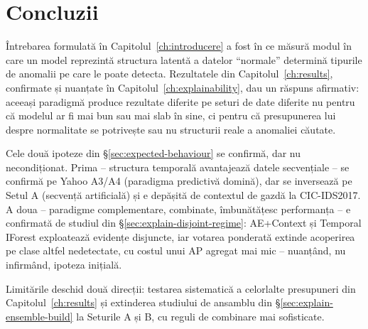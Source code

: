 \chapter{Concluzii}
\label{ch:concluzii}

Întrebarea formulată în Capitolul~\ref{ch:introducere} a fost în ce măsură modul în care un model reprezintă structura latentă a datelor \enquote{normale} determină tipurile de anomalii pe care le poate detecta. Rezultatele din Capitolul~\ref{ch:results}, confirmate și nuanțate în Capitolul~\ref{ch:explainability}, dau un răspuns afirmativ: aceeași paradigmă produce rezultate diferite pe seturi de date diferite nu pentru că modelul ar fi mai bun sau mai slab în sine, ci pentru că presupunerea lui despre normalitate se potrivește sau nu structurii reale a anomaliei căutate.

Cele două ipoteze din \S\ref{sec:expected-behaviour} se confirmă, dar nu necondiționat. Prima -- structura temporală avantajează datele secvențiale -- se confirmă pe Yahoo A3/A4 (paradigma predictivă domină), dar se inversează pe Setul A (secvență artificială) și e depășită de contextul de gazdă la CIC-IDS2017. A doua -- paradigme complementare, combinate, îmbunătățesc performanța -- e confirmată de studiul din \S\ref{sec:explain-disjoint-regime}: AE+Context și Temporal IForest exploatează evidențe disjuncte, iar votarea ponderată extinde acoperirea pe clase altfel nedetectate, cu costul unui AP agregat mai mic -- nuanțând, nu infirmând, ipoteza inițială.

Limitările deschid două direcții: testarea sistematică a celorlalte presupuneri din Capitolul~\ref{ch:results} și extinderea studiului de ansamblu din \S\ref{sec:explain-ensemble-build} la Seturile A și B, cu reguli de combinare mai sofisticate.

\enlargethispage{\baselineskip}